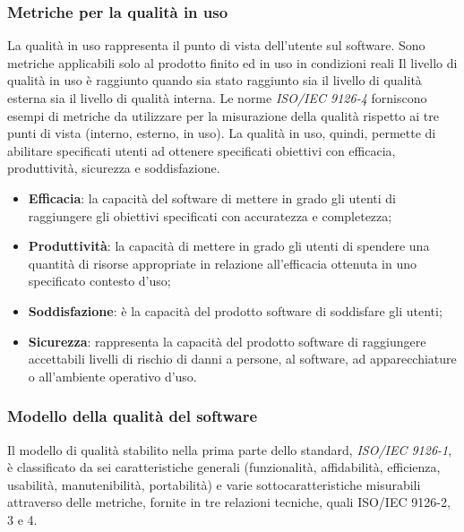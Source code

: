 \subsubsection{Metriche per la qualità in uso}
La qualità in uso rappresenta il punto di vista dell'utente sul software. Sono metriche applicabili solo al prodotto finito ed in uso in condizioni reali
Il livello di qualità in uso è raggiunto quando sia stato raggiunto sia il livello di qualità esterna sia il livello di qualità interna. Le norme \textit{ISO/IEC 9126-4} forniscono esempi di metriche da utilizzare per la misurazione della qualità rispetto ai tre punti di vista (interno, esterno, in uso). La qualità in uso, quindi, permette di abilitare specificati utenti ad ottenere specificati obiettivi con efficacia, produttività, sicurezza e soddisfazione.

\begin{itemize}
\item \textbf{Efficacia}: la capacità del software di mettere in grado gli utenti di raggiungere gli obiettivi specificati con accuratezza e completezza;
\item \textbf{Produttività}: la capacità di mettere in grado gli utenti di spendere una quantità di risorse appropriate in relazione all'efficacia ottenuta in uno specificato contesto d'uso;
\item \textbf{Soddisfazione}: è la capacità del prodotto software di soddisfare gli utenti;
\item \textbf{Sicurezza}: rappresenta la capacità del prodotto software di raggiungere accettabili livelli di rischio di danni a persone, al software, ad apparecchiature o all'ambiente operativo d'uso.
\end{itemize}

\subsubsection{Modello della qualità del software}
Il modello di qualità stabilito nella prima parte dello standard, \textit{ISO/IEC 9126-1}, è classificato da sei caratteristiche generali (funzionalità, affidabilità, efficienza, usabilità, manutenibilità, portabilità) e varie sottocaratteristiche misurabili attraverso delle metriche, fornite in tre relazioni tecniche, quali ISO/IEC 9126-2, 3 e 4. 

